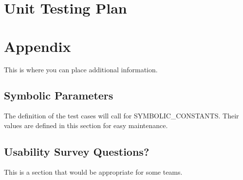\documentclass[12pt, titlepage]{article}
\begin{document}


					
					
					
					
					

					
					
					
					



				
\section{Unit Testing Plan}
		





\newpage

\section{Appendix}

This is where you can place additional information.

\subsection{Symbolic Parameters}

The definition of the test cases will call for SYMBOLIC\_CONSTANTS.
Their values are defined in this section for easy maintenance.

\subsection{Usability Survey Questions?}

This is a section that would be appropriate for some teams.
\end{document}
